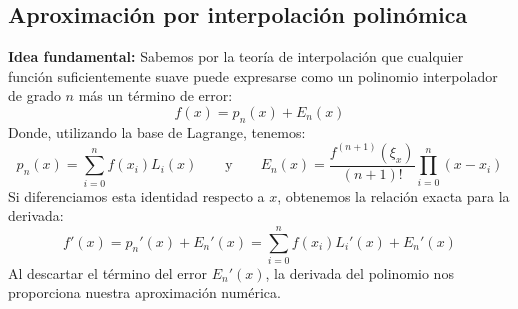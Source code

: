 \subsection{Aproximación por interpolación polinómica}

\textbf{Idea fundamental:} Sabemos por la teoría de interpolación que cualquier función suficientemente suave puede expresarse como un polinomio interpolador de grado $n$ más un término de error:
\[
    f(x) = p_n(x) + E_n(x)
\]
Donde, utilizando la base de Lagrange, tenemos:
\[
    p_n(x) = \sum_{i=0}^n f(x_i) L_i(x) \qquad \text{y} \qquad E_n(x) = \frac{f^{(n+1)}(\xi_x)}{(n+1)!} \prod_{i=0}^n (x - x_i)
\]
Si diferenciamos esta identidad respecto a $x$, obtenemos la relación exacta para la derivada:
\[
    f'(x) = p_n'(x) + E_n'(x) = \sum_{i=0}^n f(x_i) L_i'(x) + E_n'(x)
\]
Al descartar el término del error $E_n'(x)$, la derivada del polinomio nos proporciona nuestra aproximación numérica.

